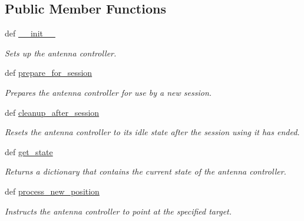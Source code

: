 \subsection*{Public Member Functions}
\begin{DoxyCompactItemize}
\item 
def \hyperlink{classhwm_1_1hardware_1_1devices_1_1drivers_1_1mxl__antenna__controller_1_1mxl__antenna__controll300dc396624a0e0bda412a3b1ecea20c_ad751645df21806c10a3afd8d76f6d6ef}{\-\_\-\-\_\-init\-\_\-\-\_\-}
\begin{DoxyCompactList}\small\item\em Sets up the antenna controller. \end{DoxyCompactList}\item 
def \hyperlink{classhwm_1_1hardware_1_1devices_1_1drivers_1_1mxl__antenna__controller_1_1mxl__antenna__controll300dc396624a0e0bda412a3b1ecea20c_aaedbe270e37dde9120f890af51a42a7d}{prepare\-\_\-for\-\_\-session}
\begin{DoxyCompactList}\small\item\em Prepares the antenna controller for use by a new session. \end{DoxyCompactList}\item 
def \hyperlink{classhwm_1_1hardware_1_1devices_1_1drivers_1_1mxl__antenna__controller_1_1mxl__antenna__controll300dc396624a0e0bda412a3b1ecea20c_a9fb4f46697cfd0a6506238a32340d0bf}{cleanup\-\_\-after\-\_\-session}
\begin{DoxyCompactList}\small\item\em Resets the antenna controller to its idle state after the session using it has ended. \end{DoxyCompactList}\item 
def \hyperlink{classhwm_1_1hardware_1_1devices_1_1drivers_1_1mxl__antenna__controller_1_1mxl__antenna__controll300dc396624a0e0bda412a3b1ecea20c_a7f9e6139a8bb387f2799a01596b0caa8}{get\-\_\-state}
\begin{DoxyCompactList}\small\item\em Returns a dictionary that contains the current state of the antenna controller. \end{DoxyCompactList}\item 
def \hyperlink{classhwm_1_1hardware_1_1devices_1_1drivers_1_1mxl__antenna__controller_1_1mxl__antenna__controll300dc396624a0e0bda412a3b1ecea20c_aa1f4ccd336b0ce18fdb6f78798e95a36}{process\-\_\-new\-\_\-position}
\begin{DoxyCompactList}\small\item\em Instructs the antenna controller to point at the specified target. \end{DoxyCompactList}\end{DoxyCompactItemize}
